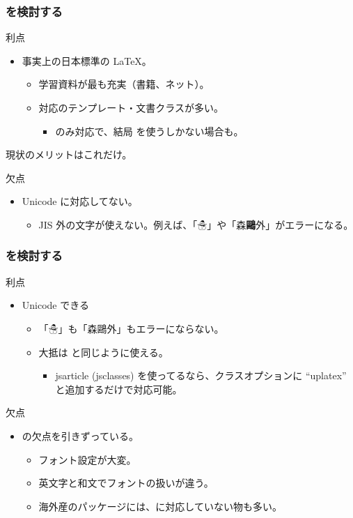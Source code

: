 \documentclass[aspectratio=149]{beamer}
\begin{document}
\begin{frame}
	\frametitle{\pLaTeX を検討する}
	\begin{block}{利点}
		\begin{itemize}
			\item 事実上の日本標準の \LaTeX。
				\begin{itemize}
					\item 学習資料が最も充実（書籍、ネット）。
					\item \pLaTeX 対応のテンプレート・文書クラスが多い。
						\begin{itemize}
							\item \pLaTeX のみ対応で、結局 \pLaTeX を使うしかない場合も。
						\end{itemize}
				\end{itemize}
		\end{itemize}
		
		現状のメリットはこれだけ。
	\end{block}
	\begin{block}{欠点}
		\begin{itemize}
			\item Unicode に対応してない。
				\begin{itemize}
					\item JIS 外の文字が使えない。例えば、「☃」や「森\textbf{鷗}外」がエラーになる。
				\end{itemize}
		\end{itemize}
	\end{block}
\end{frame}

\begin{frame}
	\frametitle{\upLaTeX を検討する}
	\begin{block}{利点}
		\begin{itemize}
			\item Unicode できる \pLaTeX
				\begin{itemize}
					\item 「☃」も「森鷗外」もエラーにならない。
					\item 大抵は \pLaTeX と同じように使える。
						\begin{itemize}
							\item jsarticle (jsclasses) を使ってるなら、クラスオプションに
								``uplatex'' と追加するだけで対応可能。
						\end{itemize}
				\end{itemize}
		\end{itemize}
	\end{block}
	\begin{block}{欠点}
		\begin{itemize}
			\item \pLaTeX の欠点を引きずっている。
				\begin{itemize}
					\item フォント設定が大変。
					\item 英文字と和文でフォントの扱いが違う。
					\item 海外産のパッケージには、\upLaTeX に対応していない物も多い。
				\end{itemize}
		\end{itemize}
	\end{block}
\end{frame}
\end{document}
